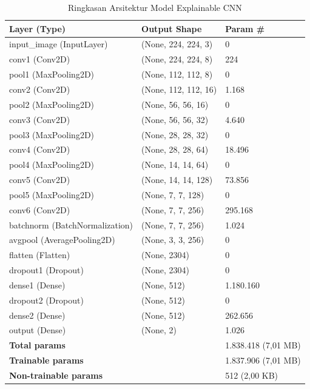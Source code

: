\begin{table}[H]
	\centering
	\caption{Ringkasan Arsitektur Model Explainable CNN}
	\label{tab:arsitektur_excnn}
	\begin{tabular}{|l|l|l|}
		\hline
		\textbf{Layer (Type)} & \textbf{Output Shape} & \textbf{Param \#} \\ \hline
		input\_image (InputLayer) & (None, 224, 224, 3) & 0 \\ \hline
		conv1 (Conv2D) & (None, 224, 224, 8) & 224 \\ \hline
		pool1 (MaxPooling2D) & (None, 112, 112, 8) & 0 \\ \hline
		conv2 (Conv2D) & (None, 112, 112, 16) & 1.168 \\ \hline
		pool2 (MaxPooling2D) & (None, 56, 56, 16) & 0 \\ \hline
		conv3 (Conv2D) & (None, 56, 56, 32) & 4.640 \\ \hline
		pool3 (MaxPooling2D) & (None, 28, 28, 32) & 0 \\ \hline
		conv4 (Conv2D) & (None, 28, 28, 64) & 18.496 \\ \hline
		pool4 (MaxPooling2D) & (None, 14, 14, 64) & 0 \\ \hline
		conv5 (Conv2D) & (None, 14, 14, 128) & 73.856 \\ \hline
		pool5 (MaxPooling2D) & (None, 7, 7, 128) & 0 \\ \hline
		conv6 (Conv2D) & (None, 7, 7, 256) & 295.168 \\ \hline
		batchnorm (BatchNormalization) & (None, 7, 7, 256) & 1.024 \\ \hline
		avgpool (AveragePooling2D) & (None, 3, 3, 256) & 0 \\ \hline
		flatten (Flatten) & (None, 2304) & 0 \\ \hline
		dropout1 (Dropout) & (None, 2304) & 0 \\ \hline
		dense1 (Dense) & (None, 512) & 1.180.160 \\ \hline
		dropout2 (Dropout) & (None, 512) & 0 \\ \hline
		dense2 (Dense) & (None, 512) & 262.656 \\ \hline
		output (Dense) & (None, 2) & 1.026 \\ \hline
		\multicolumn{2}{|l|}{\textbf{Total params}} & 1.838.418 (7,01 MB) \\ \hline
		\multicolumn{2}{|l|}{\textbf{Trainable params}} & 1.837.906 (7,01 MB) \\ \hline
		\multicolumn{2}{|l|}{\textbf{Non-trainable params}} & 512 (2,00 KB) \\ \hline
	\end{tabular}
\end{table}